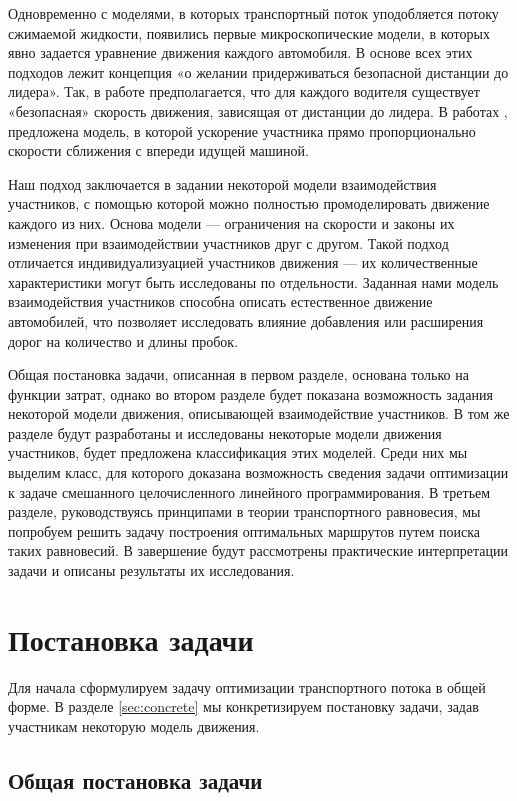 \documentclass[12pt, a4paper]{article}
\begin{document}
Одновременно с моделями, в которых транспортный поток уподобляется потоку сжимаемой жидкости, 
появились первые микроскопические модели, в которых явно задается уравнение движения каждого автомобиля. В основе всех этих подходов лежит концепция «о желании придерживаться безопасной дистанции до лидера». Так, в работе \cite{micro_newell} предполагается, что для каждого водителя существует «безопасная» скорость движения, зависящая от дистанции до лидера. В работах \cite{micro_gen_mot_1}, \cite{micro_gen_mot_2} предложена модель, в которой ускорение участника прямо пропорционально скорости сближения с впереди идущей машиной.

Наш подход заключается в задании некоторой модели взаимодействия участников, с помощью которой можно полностью промоделировать движение каждого из них. 
Основа модели --- ограничения на скорости и законы их изменения при взаимодействии участников друг с другом. Такой подход отличается индивидуализуацией участников движения --- их количественные характеристики могут быть исследованы по отдельности. Заданная нами модель взаимодействия участников способна описать естественное движение автомобилей, что позволяет исследовать влияние добавления или расширения дорог на количество и длины пробок.

Общая постановка задачи, описанная в первом разделе, основана только на функции затрат, 
однако во втором разделе будет показана возможность задания некоторой модели движения, описывающей взаимодействие участников.
В том же разделе будут разработаны и исследованы некоторые модели движения участников, будет предложена классификация этих моделей. Среди них мы выделим класс, для которого доказана возможность сведения задачи оптимизации к задаче смешанного целочисленного линейного программирования. В третьем разделе, руководствуясь принципами в теории транспортного равновесия, мы попробуем решить задачу построения оптимальных маршрутов путем поиска таких равновесий. В завершение будут рассмотрены практические интерпретации задачи и описаны результаты их исследования.

\newpage
\section{Постановка задачи}

Для начала сформулируем задачу оптимизации транспортного потока в общей форме.
В разделе \ref{sec:concrete} мы конкретизируем постановку задачи, задав участникам некоторую модель движения.

\subsection{Общая постановка задачи}
\end{document}
